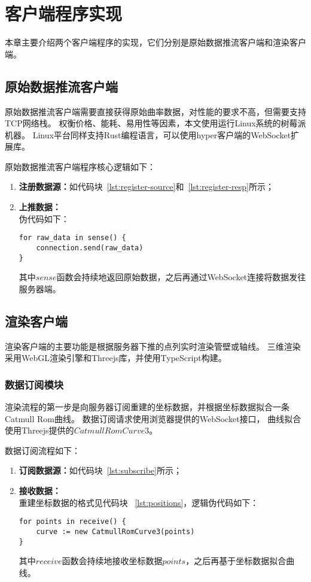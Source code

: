\section{客户端程序实现}
\label{sec:client}
本章主要介绍两个客户端程序的实现，它们分别是原始数据推流客户端和渲染客户端。

\subsection{原始数据推流客户端}
原始数据推流客户端需要直接获得原始曲率数据，对性能的要求不高，但需要支持TCP网络栈。
权衡价格、能耗、易用性等因素，本文使用运行Linux系统的树莓派机器。
Linux平台同样支持Rust编程语言，可以使用hyper客户端的WebSocket扩展库。

原始数据推流客户端程序核心逻辑如下：

\begin{enumerate}
\item \textbf{注册数据源：}如代码块~\ref{lst:register-source}和~\ref{lst:register-resp}所示；
\item \textbf{上推数据：} \\
伪代码如下：

\begin{lstlisting}[caption={上推数据}]
for raw_data in sense() {
    connection.send(raw_data)
}
\end{lstlisting}

其中$sense$函数会持续地返回原始数据，之后再通过WebSocket连接将数据发往服务器端。

\end{enumerate}

\subsection{渲染客户端}

渲染客户端的主要功能是根据服务器下推的点列实时渲染管壁或轴线。
三维渲染采用WebGL渲染引擎和Threejs库，并使用TypeScript构建。

\subsubsection{数据订阅模块}
渲染流程的第一步是向服务器订阅重建的坐标数据，并根据坐标数据拟合一条Catmull Rom曲线。
数据订阅请求使用浏览器提供的WebSocket接口\cite{mdn-websocket}，
曲线拟合使用Threejs提供的$CatmullRomCurve3$。

数据订阅流程如下：

\begin{enumerate}
\item \textbf{订阅数据源：}如代码块~\ref{lst:subscribe}所示；
\item \textbf{接收数据：} \\
重建坐标数据的格式见代码块 ~\ref{lst:positions}，逻辑伪代码如下：

\begin{lstlisting}[caption={订阅数据}]
for points in receive() {
    curve := new CatmullRomCurve3(points)
}
\end{lstlisting}

其中$receive$函数会持续地接收坐标数据$points$，之后再基于坐标数据拟合曲线。

\end{enumerate}

